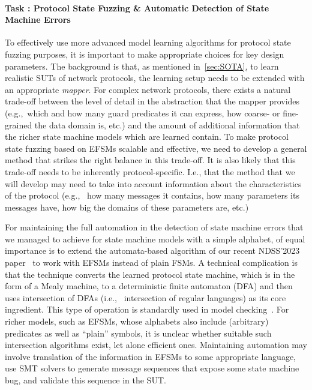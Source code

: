 \documentclass[11pt]{article}
\newcounter{Task}
\newcommand{\task}[1]{\addtocounter{Task}{1}\paragraph{Task \theTask: #1}}
\newcommand{\myparagraph}{}
\let\myparagraph=\paragraph
\renewcommand{\paragraph}{\vspace{-3mm}\myparagraph}
\newcommand{\eg}{e.\/g.,\ }
\newcommand{\ie}{i.\/e.,\ }
\begin{document}
\task{Protocol State Fuzzing \& Automatic Detection of State Machine Errors}
To effectively use more advanced model learning algorithms for protocol
state fuzzing purposes, it is important to make appropriate choices for key design parameters.
The background is that, as mentioned in~\cref{sec:SOTA}, to learn realistic SUTs of network protocols,
the learning setup needs to be extended with an appropriate \emph{mapper}.
For complex network protocols, there exists a natural trade-off between the
level of detail in the abstraction that the mapper provides (\eg which and how
many guard predicates it can express, how coarse- or fine-grained the data
domain is, etc.) and the amount of additional information that the richer
state machine models which are learned contain.  To make protocol state
fuzzing based on EFSMs scalable and effective,
we need to develop a general method that strikes the right balance in this
trade-off.
%
It is also likely that this trade-off needs to be inherently
protocol-specific.  I.e., that the method that we will develop may need to
take into account information about the characteristics of the protocol (\eg
how many messages it contains, how many parameters its messages have, how big
the domains of these parameters are, etc.)

For maintaining the full automation in the detection of state machine errors
that we managed to achieve for state machine models with a simple alphabet, of
equal importance is to extend the automata-based algorithm of our recent
NDSS'2023 paper~\cite{AutomataBased@NDSS-23} to work with EFSMs instead of
plain FSMs.  A technical complication is that the technique converts the
learned protocol state machine, which is in the form of a Mealy machine, to a
deterministic finite automaton (DFA) and then uses intersection of DFAs (\ie
intersection of regular languages) as its core ingredient. This type of
operation is standardly used in model checking~\cite{MC:handbook}.
For richer models, such as EFSMs, whose alphabets also include (arbitrary)
predicates as well as ``plain'' symbols, it is unclear whether suitable such
intersection algorithms exist, let alone efficient ones. Maintaining
automation may involve translation of the information in EFSMs to some
appropriate language, use SMT solvers to generate message sequences that
expose some state machine bug, and validate this sequence in the SUT.
\end{document}

